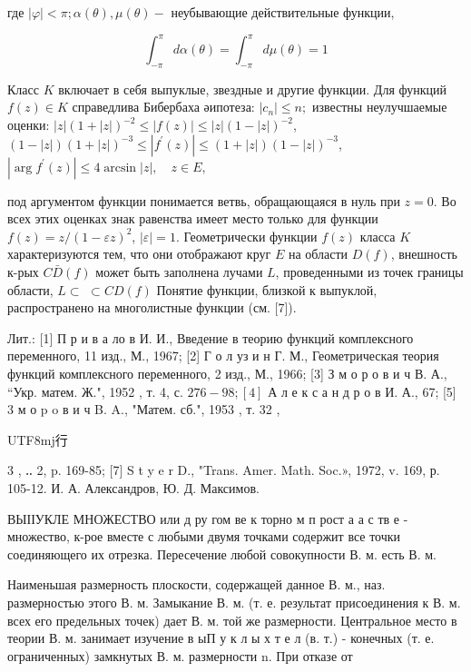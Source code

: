 \documentclass[10pt]{article}
\begin{document}
где $|\varphi|<\pi ; \alpha(\theta), \mu(\theta)-$ неубывающие действительные функции,



\[

\int_{-\pi}^{\pi} d \alpha(\theta)=\int_{-\pi}^{\pi} d \mu(\theta)=1

\]



Класс $K$ включает в себя выпуклые, звездные и другие функции. Для функций $f(z) \in K$ справедлива Бибербаха әипотеза: $\left|c_{n}\right| \leqslant n ;$ известны неулучшаемые оценки: $|z|(1+|z|)^{-2} \leqslant|f(z)| \leqslant|z|(1-|z|)^{-2}$, $(1-|z|)(1+|z|)^{-3} \leqslant\left|f^{\prime}(z)\right| \leqslant(1+|z|)(1-|z|)^{-3}$, $\left|\arg f^{\prime}(z)\right| \leqslant 4 \arcsin |z|, \quad z \in E$,



под аргументом функции понимается ветвь, обращающаяся в нуль при $z=0$. Во всех этих оценках знак равенства имеет место только для функции $f(z)=z /(1-\varepsilon z)^{2}$, $|\varepsilon|=1$. Геометрически функции $f(z)$ класса $K$ характеризуются тем, что они отображают круг $E$ на области $D(f)$, внешность к-рых $C \bar{D}(f)$ может быть заполнена лучами $L$, проведенными из точек границы области, $L \subset$ $\subset C D(f)$ Понятие функции, близкой к выпуклой, распространено на многолистные функции (см. [7]).



Лит.: [1] П р и в а ло в И. И., Введение в теорию функций комплексного переменного, 11 изд., М., 1967; [2] Г о л уз и н Г. М., Геометрическая теория функций комплексного переменного, 2 изд., М., 1966; [3] З м о р о в и ч В. А., “Укр. матем. Ж.", 1952 , т. 4, с. $276-98 ;[4]$ А л е к с а н д р о в И. А., 67; [5] 3 м о p o в и ч B. A., "Матем. сб.", 1953 , т. 32 , \begin{CJK}{UTF8}{mj}行\end{CJK} 3 , ‥ 2, p. 169-85; [7] S t y e r D., "Trans. Amer. Math. Soc.», 1972, v. 169, р. 105-12. И. А. Александров, Ю. Д. Максимов.



ВЫІІУКЛЕ МНОЖЕСТВО или д ру гом ве к торно м п рост а а с тв е - множество, к-рое вместе с любыми двумя точками содержит все точки соединяющего их отрезка. Пересечение любой совокупности В. м. есть В. м.



Наименьшая размерность плоскости, содержащей данное В. м., наз. размерностью этого В. м. Замыкание В. м. (т. е. результат присоединения к В. м. всех его предельных точек) дает В. м. той же размерности. Центральное место в теории В. м. занимает изучение в ыП у к л ы х т е л (в. т.) - конечных (т. е. ограниченных) замкнутых В. м. размерности n. При отказе от
\end{document}
